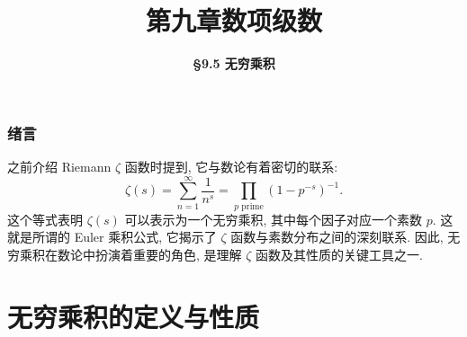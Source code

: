 \everymath{\displaystyle}



\title[第九章\\
数项级数]{\texorpdfstring{\LARGE \bfseries 第九章\quad 数项级数}{第九章 数项级数}} %
\author[\smaller \S 9.5\\
无穷乘积] %
{\Large \bfseries \S 9.5 无穷乘积}
\date{}





\begin{frame}

\titlepage %

\end{frame}



\begin{frame}
\frametitle{绪言}

{
\larger[1]
之前介绍 Riemann $\zeta$ 函数时提到, 它与数论有着密切的联系:
\[
\zeta(s) = \sum_{n=1}^\infty \frac{1}{n^s} = \prod_{p\text{ prime}} \left(1 - p^{-s}\right)^{-1}.
\]
这个等式表明 $\zeta(s)$ 可以表示为一个无穷乘积, 其中每个因子对应一个素数 $p$. 这就是所谓的 Euler 乘积公式, 它揭示了 $\zeta$ 函数与素数分布之间的深刻联系. 因此, 无穷乘积在数论中扮演着重要的角色, 是理解 $\zeta$ 函数及其性质的关键工具之一.
}

\end{frame}


\section{无穷乘积的定义与性质}

